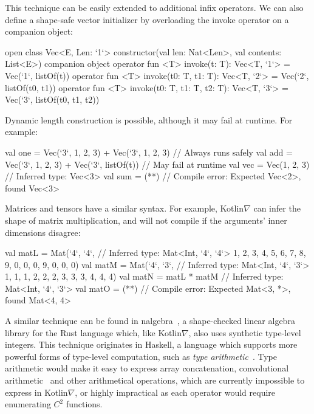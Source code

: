 \documentclass[12pt,initial,twoside,maitrise]{dms}
\makeatletter
\def\uwave{\bgroup \markoverwith{\lower3.5\p@\hbox{\sixly \textcolor{red}{\char58}}}\ULon}
\numberwithin{equation}{section}
\numberwithin{table}{chapter}
\numberwithin{figure}{chapter}
\makeatother
\begin{document}
%
This technique can be easily extended to additional infix operators. We can also define a shape-safe vector initializer by overloading the invoke operator on a companion object:
%
\begin{kotlinlisting}
open class Vec<E, Len: `1`> constructor(val len: Nat<Len>, val contents: List<E>) {
  companion object {
    operator fun <T> invoke(t: T): Vec<T, `1`> = Vec(`1`, listOf(t))
    operator fun <T> invoke(t0: T, t1: T): Vec<T, `2`> = Vec(`2`, listOf(t0, t1))
    operator fun <T> invoke(t0: T, t1: T, t2: T): Vec<T, `3`> = Vec(`3`, listOf(t0, t1, t2))
  }
}
\end{kotlinlisting}
%
Dynamic length construction is possible, although it may fail at runtime. For example:
%
\begin{kotlinlisting}
val one = Vec(`3`, 1, 2, 3) + Vec(`3`, 1, 2, 3)   // Always runs safely
val add = Vec(`3`, 1, 2, 3) + Vec(`3`, listOf(t)) // May fail at runtime
val vec = Vec(1, 2, 3) // Inferred type: Vec<3>
val sum = (*\uwave{Vec(`2`, 1, 2) + add}*) // Compile error: Expected Vec<2>, found Vec<3>
\end{kotlinlisting}
%
Matrices and tensors have a similar syntax. For example, Kotlin$\nabla$ can infer the shape of matrix multiplication, and will not compile if the arguments' inner dimensions disagree:
%
\begin{kotlinlisting}
val matL = Mat(`4`, `4`, // Inferred type: Mat<Int, `4`, `4`>
               1, 2, 3, 4,
               5, 6, 7, 8,
               9, 0, 0, 0,
               9, 0, 0, 0)
val matM = Mat(`4`, `3`, // Inferred type: Mat<Int, `4`, `3`>
               1, 1, 1,
               2, 2, 2,
               3, 3, 3,
               4, 4, 4)
val matN = matL * matM // Inferred type: Mat<Int, `4`, `3`>
val matO = (*\uwave{matM *\ matM}*) // Compile error: Expected Mat<3, *>, found Mat<4, 4>
\end{kotlinlisting}
%
A similar technique can be found in nalgebra~\citep{crozet2019nalgebra}, a shape-checked linear algebra library for the Rust language which, like Kotlin$\nabla$, also uses synthetic type-level integers. This technique originates in Haskell, a language which supports more powerful forms of type-level computation, such as \textit{type arithmetic}~\citep{kiselyov2005number}. Type arithmetic would make it easy to express array concatenation, convolutional arithmetic~\citep{dumoulin2016guide} and other arithmetical operations, which are currently impossible to express in Kotlin$\nabla$, or highly impractical as each operator would require enumerating $C^2$ functions.
\end{document}
